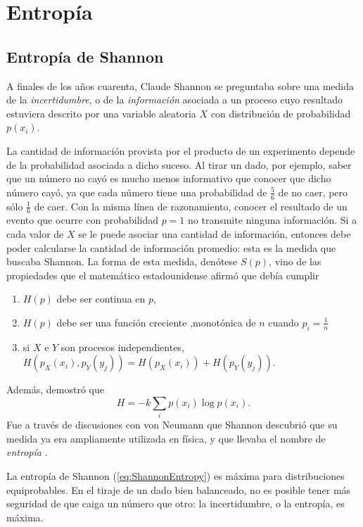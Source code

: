 \section{Entropía}
\subsection{Entropía de Shannon}
A finales de los años cuarenta, Claude Shannon se preguntaba sobre una medida de la \textit{incertidumbre}, o de la \textit{información} asociada a un proceso cuyo resultado estuviera descrito por una variable aleatoria $X$ con distribución de probabilidad $p(x_{i})$.

La cantidad de información provista por el producto de un experimento depende de la probabilidad asociada a dicho suceso. Al tirar un dado, por ejemplo, saber que un número no cayó es mucho menos informativo que conocer que dicho número cayó, ya que cada número tiene una probabilidad de $\frac{5}{6}$ de no caer, pero sólo $\frac{1}{6}$ de caer. Con la misma línea de razonamiento, conocer el resultado de un evento que ocurre con probabilidad $p=1$ no transmite ninguna información. Si a cada valor de $X$ se le puede asociar una cantidad de información, entonces debe poder calcularse la cantidad de información promedio: esta es la medida que buscaba Shannon. La forma de esta medida, denótese $S(p)$, vino de las propiedades que el matemático estadounidense afirmó que debía cumplir \cite{Shannon,Wilde}
\begin{enumerate}
    \item $H(p)$ debe ser continua en $p$,
    \item $H(p)$ debe ser una función creciente ,monotónica de $n$ cuando $p_{i}=\frac{1}{n}$
    \item si $X$ e $Y$ son procesos independientes, $H(p_{X}(x_{i}),p_{Y}(y_{j}))=H(p_{X}(x_{i}))+H(p_{Y}(y_{j}))$.
\end{enumerate}
Además, demostró que
\begin{equation}\label{eq:ShannonEntropy}
    H=-k\sum_{i}p(x_{i})\log{p(x_{i})}.
\end{equation}
Fue a través de discusiones con von Neumann que Shannon descubrió que su medida ya era ampliamente utilizada en física, y que llevaba el nombre de \textit{entropía} \cite{McIrvine}.

La entropía de Shannon (\ref{eq:ShannonEntropy}) es máxima para distribuciones equiprobables. En el tiraje de un dado bien balanceado, no es posible tener más seguridad de que caiga un número que otro: la incertidumbre, o la entropía, es máxima.

